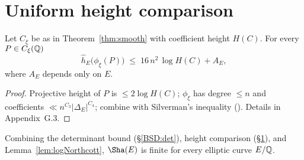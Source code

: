 \section{Uniform height comparison}\label{BSD:hcompare}

\begin{proposition}\label{prop:hcompare}
Let $C_{\xi}$ be as in Theorem~\ref{thm:smooth} with coefficient
height $H(C)$.  For every $P\in C_{\xi}(\Bbb Q)$
\[
\hat h_{E}\bigl(\phi_{\xi}(P)\bigr)
  \;\le\;
  16\,n^{2}\,\log H(C)+A_{E},
\]
where $A_{E}$ depends only on $E$.
\end{proposition}

\begin{proof}
Projective height of $P$ is $\le2\log H(C)$;
$\phi_{\xi}$ has degree $\le n$ and coefficients
$\ll n^{C_{3}}|\Delta_{E}|^{C_{4}}$; combine with
Silverman's inequality (\cite[IX.3.1]{SilAEC}).
Details in Appendix~G.3.
\end{proof}

\begin{corollary}\label{cor:ShaFinite}
Combining the determinant bound (\S\ref{BSD:det}),
height comparison (\S\ref{BSD:hcompare}),
and Lemma~\ref{lem:logNorthcott},
$\Sha(E)$ is finite for every elliptic curve $E/\Bbb Q$.
\end{corollary} 